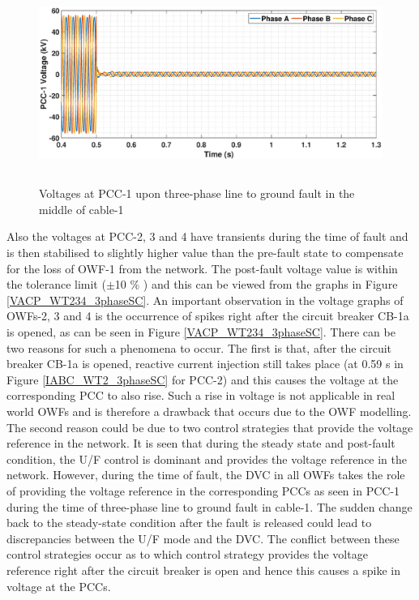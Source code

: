 \begin{figure}[H]
    \includegraphics[height = 6.5cm,width = \textwidth]{Diagrams/Chapter_5/VABC_WT1_3phaseSC.eps}
    \caption{Voltages at PCC-1 upon three-phase line to ground fault in the middle of cable-1}
    \label{VABC_WT1_3phaseSC}
\end{figure}

Also the voltages at \gls{PCC}-2, 3 and 4 have transients during the time of fault and is then stabilised to slightly higher value than the pre-fault state to compensate for the loss of \gls{OWF}-1 from the network. The post-fault voltage value is within the tolerance limit ($\pm$10 \% ) and this can be viewed from the graphs in Figure \ref{VACP_WT234_3phaseSC}. An important observation in the voltage graphs of \gls{OWF}s-2, 3 and 4 is the occurrence of spikes right after the circuit breaker CB-1a is opened, as can be seen in Figure \ref{VACP_WT234_3phaseSC}. 
There can be two reasons for such a phenomena to occur. The first is that, after the circuit breaker CB-1a is opened, reactive current injection still takes place (at 0.59 s in Figure \ref{IABC_WT2_3phaseSC} for \gls{PCC}-2) and this causes the voltage at the corresponding \gls{PCC} to also rise. Such a rise in voltage is not applicable in real world \gls{OWF}s and is therefore a drawback that occurs due to the \gls{OWF} modelling. The second reason could be due to two control strategies that provide the voltage reference in the network. It is seen that during the steady state and post-fault condition, the U/F control is dominant and provides the voltage reference in the network. However, during the time of fault, the \gls{DVC} in all \gls{OWF}s takes the role of providing the voltage reference in the corresponding \gls{PCC}s as seen in \gls{PCC}-1 during the time of three-phase line to ground fault in cable-1. The sudden change back to the steady-state condition after the fault is released could lead to discrepancies between the U/F mode and the \gls{DVC}. The conflict between these control strategies occur as to which control strategy provides the voltage reference right after the circuit breaker is open and hence this causes a spike in voltage at the \gls{PCC}s.

